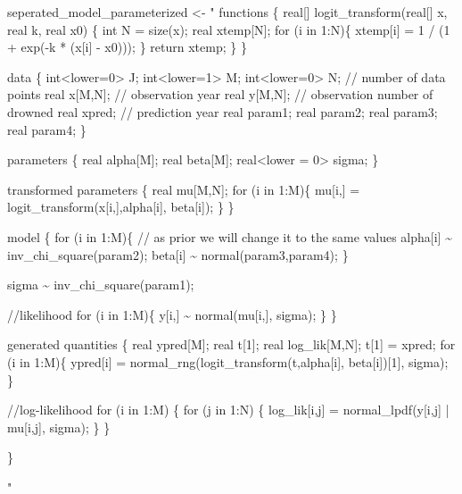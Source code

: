 \documentclass[
]{article}
\newenvironment{Shaded}{\begin{snugshade}}{\end{snugshade}}
\newcommand{\NormalTok}[1]{#1}
\newcommand{\OtherTok}[1]{\textcolor[rgb]{0.56,0.35,0.01}{#1}}
\newcommand{\StringTok}[1]{\textcolor[rgb]{0.31,0.60,0.02}{#1}}
\begin{document}
\begin{Shaded}
\begin{Highlighting}[]
\NormalTok{seperated\_model\_parameterized }\OtherTok{\textless{}{-}} \StringTok{"}
\StringTok{functions \{}
\StringTok{  real[] logit\_transform(real[] x, real k, real x0) \{}
\StringTok{    int N = size(x);}
\StringTok{    real xtemp[N];}
\StringTok{    for (i in 1:N)\{}
\StringTok{      xtemp[i] = 1 / (1 + exp({-}k * (x[i] {-} x0)));}
\StringTok{    \}}
\StringTok{     return xtemp;}
\StringTok{  \}}
\StringTok{\}}

\StringTok{data \{}
\StringTok{    int\textless{}lower=0\textgreater{} J;}
\StringTok{    int\textless{}lower=1\textgreater{} M;}
\StringTok{    int\textless{}lower=0\textgreater{} N; // number of data points}
\StringTok{    real x[M,N]; // observation year}
\StringTok{    real y[M,N]; // observation number of drowned}
\StringTok{    real xpred;  // prediction year}
\StringTok{    real param1;}
\StringTok{    real param2;}
\StringTok{    real param3;}
\StringTok{    real param4;}
\StringTok{\}}

\StringTok{parameters \{}
\StringTok{  real alpha[M];}
\StringTok{  real beta[M];}
\StringTok{  real\textless{}lower = 0\textgreater{} sigma;}
\StringTok{\}}

\StringTok{transformed parameters \{}
\StringTok{  real mu[M,N];}
\StringTok{  for (i in 1:M)\{}
\StringTok{    mu[i,] = logit\_transform(x[i,],alpha[i], beta[i]);}
\StringTok{  \}}
\StringTok{\}}

\StringTok{model \{}
\StringTok{  for (i in 1:M)\{}
\StringTok{    // as prior we will change it to the same values}
\StringTok{    alpha[i] \textasciitilde{} inv\_chi\_square(param2);}
\StringTok{    beta[i] \textasciitilde{} normal(param3,param4);}
\StringTok{  \}}

\StringTok{  sigma \textasciitilde{} inv\_chi\_square(param1);}

\StringTok{  //likelihood}
\StringTok{  for (i in 1:M)\{}
\StringTok{    y[i,] \textasciitilde{} normal(mu[i,], sigma);}
\StringTok{  \}}
\StringTok{\}}

\StringTok{generated quantities \{}
\StringTok{  real ypred[M];}
\StringTok{  real t[1];}
\StringTok{  real log\_lik[M,N];}
\StringTok{  t[1] = xpred;}
\StringTok{  for (i in 1:M)\{}
\StringTok{    ypred[i] = normal\_rng(logit\_transform(t,alpha[i], beta[i])[1], sigma);}
\StringTok{  \}}

\StringTok{  //log{-}likelihood}
\StringTok{  for (i in 1:M) \{}
\StringTok{    for (j in 1:N) \{}
\StringTok{    log\_lik[i,j] = normal\_lpdf(y[i,j] | mu[i,j], sigma);}
\StringTok{    \}}
\StringTok{  \}}

\StringTok{\}}

\StringTok{"}
\end{Highlighting}
\end{Shaded}
\end{document}
